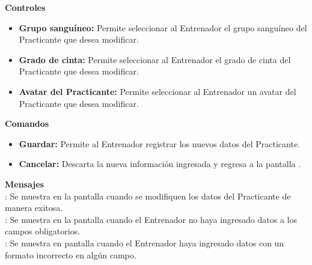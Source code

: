 \textbf{\textcolor[rgb]{0, 0, 0.545098}{Controles}}
\begin{itemize}
	\item \textbf{\textcolor[rgb]{0, 0, 0.545098}{Grupo sanguíneo:}} Permite seleccionar al Entrenador el grupo sanguíneo del Practicante que desea modificar.
	\item \textbf{\textcolor[rgb]{0, 0, 0.545098}{Grado de cinta:}} Permite seleccionar al Entrenador el grado de cinta del Practicante que desea modificar.
	\item \textbf{\textcolor[rgb]{0, 0, 0.545098}{Avatar del Practicante:}} Permite seleccionar al Entrenador un avatar del Practicante que desea modificar.
\end{itemize}
\vspace{1em}

\textbf{\textcolor[rgb]{0, 0, 0.545098}{Comandos}}
\begin{itemize}
	\item \textbf{\textcolor[rgb]{0, 0, 0.545098}{Guardar:}} Permite al Entrenador registrar los nuevos datos del Practicante.
	\item \textbf{\textcolor[rgb]{0, 0, 0.545098}{Cancelar:}} Descarta la nueva información ingresada y regresa a la pantalla . 
\end{itemize}

\vspace{1em}

\textbf{\textcolor[rgb]{0, 0, 0.545098}{Mensajes}}\\
	
\textbf{}: Se muestra en la pantalla  cuando se modifiquen los datos del Practicante de manera exitosa.\\

\textbf{}: Se muestra en la pantalla  cuando el Entrenador no haya ingresado datos a los campos obligatorios.\\
 
\textbf{}: Se muestra en pantalla cuando el Entrenador haya ingresado datos con un formato incorrecto en algún campo.\\

\clearpage
